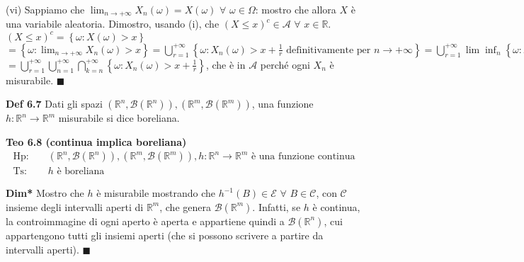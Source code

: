 \documentclass{article}
\begin{document}
(vi) Sappiamo che $\lim_{n\rightarrow +\infty }X_{n}\left( \omega \right)
=X\left( \omega \right) $ $\forall $ $\omega \in \Omega $: mostro che allora 
$X$ \`{e} una variabile aleatoria. Dimostro, usando (i), che $\left( X\leq
x\right) ^{c}\in \mathcal{A}$ $\forall $ $x\in 
\mathbb{R}
$. $\left( X\leq x\right) ^{c}=\left\{ \omega :X\left( \omega \right)
>x\right\} $ $=\left\{ \omega :\lim_{n\rightarrow +\infty }X_{n}\left(
\omega \right) >x\right\} =\bigcup_{r=1}^{+\infty }\left\{ \omega
:X_{n}\left( \omega \right) >x+\frac{1}{r}\text{ definitivamente per }%
n\rightarrow +\infty \right\} =\bigcup_{r=1}^{+\infty }\lim \inf_{n}\left\{
\omega :X_{n}\left( \omega \right) >x+\frac{1}{r}\right\} $ $%
=\bigcup_{r=1}^{+\infty }\bigcup_{n=1}^{+\infty }\bigcap_{k=n}^{+\infty
}\left\{ \omega :X_{n}\left( \omega \right) >x+\frac{1}{r}\right\} $, che 
\`{e} in $\mathcal{A}$ perch\'{e} ogni $X_{n}$ \`{e} misurabile. $%
\blacksquare $

\textbf{Def 6.7} Dati gli spazi $\left( 
\mathbb{R}
^{n},\mathcal{B}\left( 
\mathbb{R}
^{n}\right) \right) ,\left( 
\mathbb{R}
^{m},\mathcal{B}\left( 
\mathbb{R}
^{m}\right) \right) $, una funzione $h:%
\mathbb{R}
^{n}\rightarrow 
\mathbb{R}
^{m}$ misurabile si dice boreliana.

\textbf{Teo 6.8 (continua implica boreliana)}%
\begin{eqnarray*}
\text{Hp}\text{: } &&\left( 
\mathbb{R}
^{n},\mathcal{B}\left( 
\mathbb{R}
^{n}\right) \right) ,\left( 
\mathbb{R}
^{m},\mathcal{B}\left( 
\mathbb{R}
^{m}\right) \right) ,h:%
\mathbb{R}
^{n}\rightarrow 
\mathbb{R}
^{m}\text{ \`{e} una funzione continua} \\
\text{Ts}\text{: } &&h\text{ \`{e} boreliana}
\end{eqnarray*}

\textbf{Dim*} Mostro che $h$ \`{e} misurabile mostrando che $h^{-1}\left(
B\right) \in \mathcal{E}$ $\forall $ $B\in \mathcal{C}$, con $\mathcal{C}$
insieme degli intervalli aperti di $%
\mathbb{R}
^{m}$, che genera $\mathcal{B}\left( 
\mathbb{R}
^{m}\right) $. Infatti, se $h$ \`{e} continua, la controimmagine di ogni
aperto \`{e} aperta e appartiene quindi a $\mathcal{B}\left( 
\mathbb{R}
^{n}\right) $, cui appartengono tutti gli insiemi aperti (che si possono
scrivere a partire da intervalli aperti). $\blacksquare $
\end{document}
